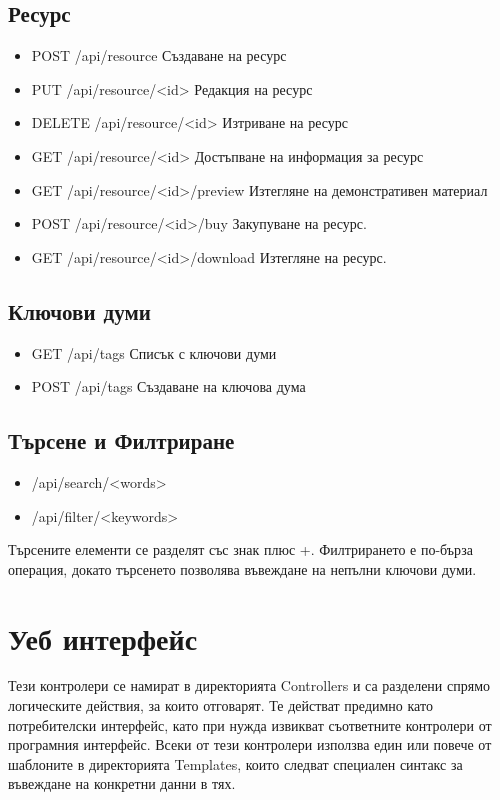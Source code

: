\subsection{Ресурс}
\begin{itemize}
    \item POST /api/resource
        Създаване на ресурс
    \item PUT /api/resource/<id>
        Редакция на ресурс
    \item DELETE /api/resource/<id>
        Изтриване на ресурс
    \item GET /api/resource/<id>
        Достъпване на информация за ресурс
    \item GET /api/resource/<id>/preview
        Изтегляне на демонстративен материал
    \item POST /api/resource/<id>/buy
        Закупуване на ресурс.
    \item GET /api/resource/<id>/download
        Изтегляне на ресурс.
\end{itemize}

\subsection{Ключови думи}
\begin{itemize}
    \item GET /api/tags
        Списък с ключови думи
    \item POST /api/tags
        Създаване на ключова дума
\end{itemize}

\subsection{Търсене и Филтриране}
\begin{itemize}
    \item /api/search/<words>
    \item /api/filter/<keywords>
\end{itemize}
Търсените елементи се разделят със знак плюс +.
Филтрирането е по-бърза операция, докато търсенето
позволява въвеждане на непълни ключови думи.

\section{Уеб интерфейс}
Тези контролери се намират в директорията Controllers
и са разделени спрямо логическите действия, за които
отговарят. Те действат предимно като потребителски
интерфейс, като при нужда извикват съответните контролери
от програмния интерфейс.
Всеки от тези контролери използва един или повече от
шаблоните в директорията Templates, които следват
специален синтакс за въвеждане на конкретни данни в тях.

